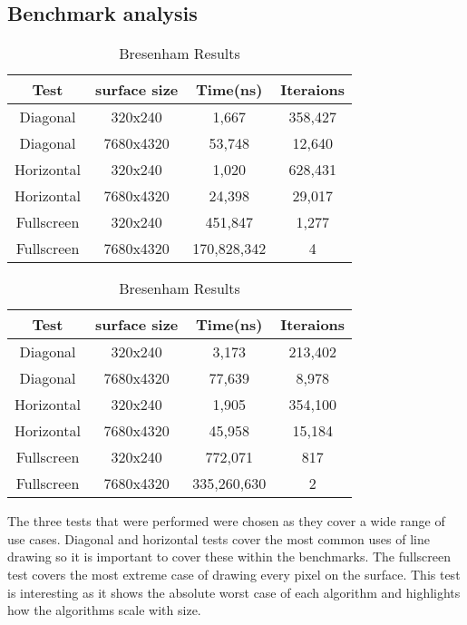 \documentclass[
	a4paper, %
	10pt, %
]{CSUniSchoolLabReport}
\begin{document}
\subsection*{Benchmark analysis}
\begin{table}[!htb]
    \caption{Line Benchmark Results}
    \begin{minipage}{.5\linewidth}
      \caption{DDA Results}
      \centering
        \begin{tabular}{c c c c}
            Test & surface size & Time(ns) & Iteraions \\ [0.5ex]
			\hline
			Diagonal & 320x240 & 1,667 & 358,427 \\
			Diagonal & 7680x4320 & 53,748 & 12,640 \\
			Horizontal & 320x240 & 1,020 & 628,431  \\
			Horizontal & 7680x4320 & 24,398 & 29,017 \\
			Fullscreen & 320x240 & 451,847 & 1,277 \\
			Fullscreen & 7680x4320 & 170,828,342 & 4 \\
        \end{tabular}
    \end{minipage}%
	\vline
    \begin{minipage}{.5\linewidth}
      \centering
        \caption{Bresenham Results}
        \begin{tabular}{c c c c}
            Test & surface size & Time(ns) & Iteraions \\ [0.5ex]
			\hline
			Diagonal & 320x240 & 3,173 & 213,402 \\
			Diagonal & 7680x4320 & 77,639 & 8,978 \\
			Horizontal & 320x240 & 1,905 & 354,100 \\
			Horizontal & 7680x4320 & 45,958 & 15,184 \\
			Fullscreen & 320x240 & 772,071 & 817 \\
			Fullscreen & 7680x4320 & 335,260,630 & 2 \\
        \end{tabular}
    \end{minipage} 
\end{table}
\begin{flushleft}
	The three tests that were performed were chosen as they cover a wide range of use 
	cases. Diagonal and horizontal tests cover the most common uses of line drawing so 
	it is important to cover these within the benchmarks. The fullscreen test covers the
	most extreme case of drawing every pixel on the surface. This test is interesting as it 
	shows the absolute worst case of each algorithm and highlights how the algorithms scale with size.
\end{flushleft}
\end{document}
